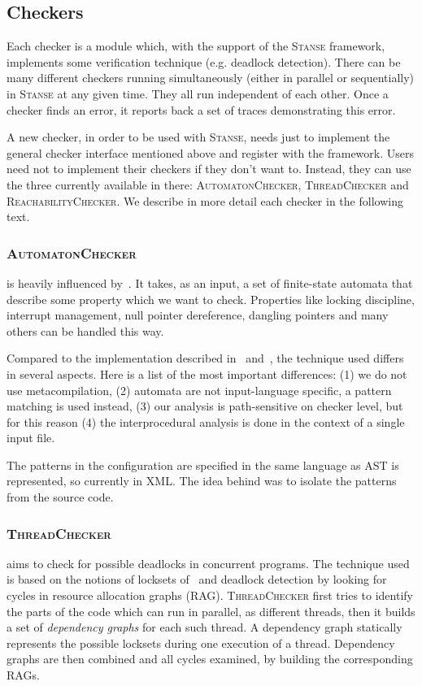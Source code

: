 \documentclass[10pt]{llncs}
\newcommand{\Stanse}{\textsc{Stanse}\xspace}
\newcommand{\TC}{\textsc{ThreadChecker}\xspace}
\newcommand{\AC}{\textsc{AutomatonChecker}\xspace}
\newcommand{\RC}{\textsc{ReachabilityChecker}\xspace}
\begin{document}
\subsection{Checkers}
\label{sec:checkers}

Each checker is a module which, with the support of the \Stanse framework,
implements some verification technique (e.g. deadlock detection). There can be
many different checkers running simultaneously (either in parallel or
sequentially) in \Stanse at any given time. They all run independent of each
other. Once a checker finds an error, it reports back a set of traces
demonstrating this error.

A new checker, in order to be used with \Stanse, needs just to implement the
general checker interface mentioned above and register with the framework.
Users need not to implement their checkers if they don't want to. Instead,
they can use the three currently available in there: \AC, \TC and \RC. We
describe in more detail each checker in the following text.

\vspace{-.7\baselineskip}
\subsubsection{\AC}
is heavily influenced by~\cite{ECCH00}. It takes, as an input, a set of
finite-state automata that describe some property which we want to check.
Properties like locking discipline, interrupt management, null pointer
dereference, dangling pointers and many others can be handled this way.

Compared to the implementation described in~\cite{ECCH00} and~\cite{HCXE02},
the technique used  differs in several aspects. Here is a list of the
most important differences: (1) we do not use metacompilation, (2) automata
are not input-language specific, a pattern matching is used instead, (3) our
analysis is path-sensitive on checker level, but for this reason (4) the
interprocedural analysis is done in the context of a single input file.

The patterns in the configuration are specified in the same language as AST is
represented, so currently in XML. The idea behind was to isolate the patterns
from the source code.

\vspace{-.7\baselineskip}
\subsubsection{\TC}
aims to check for possible deadlocks in concurrent programs. The
technique used is based on the notions of locksets of~\cite{relay} and
deadlock detection by looking for cycles in resource allocation graphs (RAG).
\TC first tries to identify the parts of the code which can run in parallel,
as different threads, then it builds a set of \emph{dependency graphs} for
each such thread. A dependency graph statically represents the possible
locksets during one execution of a thread. Dependency graphs are
then combined and all cycles examined, by building the corresponding RAGs.
\end{document}
